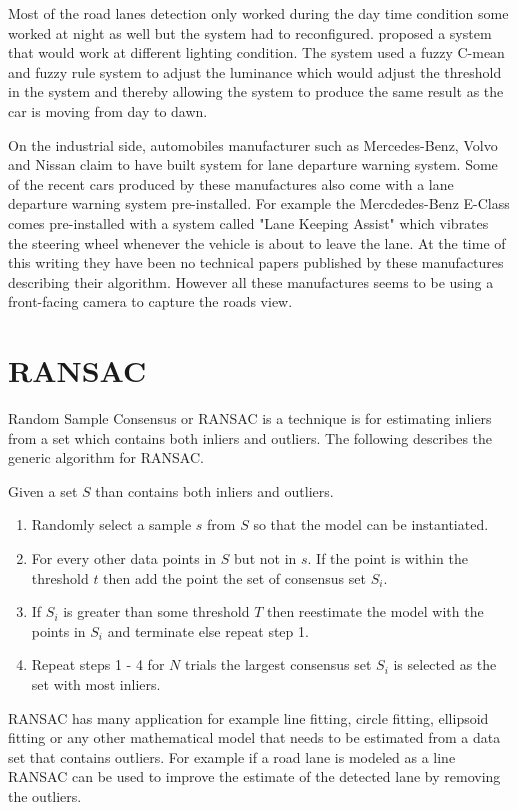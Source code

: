 Most of the road lanes detection only worked during the day time condition some 
worked at night as well but the system had to reconfigured. 
 proposed a system that would work at different lighting 
condition. The system used a fuzzy C-mean and fuzzy rule system to adjust the 
luminance which would adjust the threshold in the system and thereby allowing 
the system to produce the same result as the car is moving from day to dawn. 

On the industrial side, automobiles manufacturer such as Mercedes-Benz, Volvo
and Nissan claim to have built system for lane departure warning system. Some
of the recent cars produced by these manufactures also come with a lane
departure warning system pre-installed. For example the Mercdedes-Benz 
E-Class comes pre-installed with a system called "Lane 
Keeping Assist" which vibrates the steering wheel whenever the vehicle is about 
to leave the lane. At the time of this writing they have been no technical 
papers published by these manufactures describing their algorithm. However all 
these manufactures seems to be using a front-facing
camera to capture the roads view.


\section{RANSAC}
Random Sample Consensus or RANSAC is a technique is for 
estimating inliers from a set which contains both inliers and outliers. The 
following describes the generic algorithm for RANSAC.

Given a set $S$ than contains both inliers and outliers.
\begin{enumerate}
\item Randomly select a sample $s$ from $S$ so that the model can be
instantiated.
\item For every other data points in $S$ but not in $s$. If the point is within
the threshold $t$ then add the point the set of consensus set $S_{i}$. 
\item If $S_{i}$ is greater than some threshold $T$ then reestimate the model
with the points in $S_{i}$ and terminate else repeat step 1. 
\item Repeat steps 1 - 4 for $N$ trials the largest consensus set $S_{i}$ is
selected as the set with most inliers. 
\end{enumerate}

RANSAC has many application for example line fitting, circle fitting, ellipsoid 
fitting or any other mathematical model that needs to be estimated from a data 
set that contains outliers. For example if a road lane is modeled as a line 
RANSAC can be used to improve the estimate of the detected lane by removing the 
outliers. 

